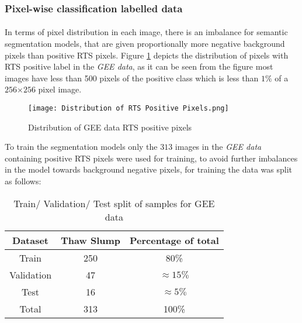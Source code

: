 \subsubsection{Pixel-wise classification labelled data}
\paragraph{}
In terms of pixel distribution in each image, there is an imbalance for semantic segmentation models, that are given proportionally more negative background pixels than positive \gls{RTS} pixels. 
Figure \ref{rts_pixel_dist} depicts the distribution of pixels with \gls{RTS} positive label in the \textit{\gls{GEE} data}, as it can be seen from the figure most images have less than 500 pixels of the positive class which is less than $1\%$ of a $256$×$256$ pixel image.
    \begin{figure}[hbt!]
        \centering
        \texttt{[image: Distribution of RTS Positive Pixels.png]}
        \caption{Distribution of \gls{GEE} data \gls{RTS} positive pixels}
        \label{rts_pixel_dist}
    \end{figure}
    
To train the segmentation models only the $313$ images in the \textit{\gls{GEE} data} containing positive \gls{RTS} pixels were used for training, to avoid further imbalances in the model towards background negative pixels, for training the data was split as follows:
\begin{table}[ht!] 
    \begin{center}
    \begin{tabular}{c|c|c}     
    \textbf{Dataset} & \textbf{Thaw Slump} & \textbf{Percentage of total} \\
    \hline
    Train 
    & 250 & 80\% \\
    \hline
    Validation 
    &  47 & $\approx 15\%$  \\
    \hline
    Test 
    &  16 & $\approx 5\%$ \\
    \hline
    Total 
    &  313 & 100\% \\
    \hline
    \end{tabular}
    \caption{Train/ Validation/ Test split of samples for \gls{GEE} data} \label{table_label_data_gee}
    \end{center}
\end{table}

